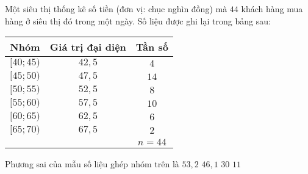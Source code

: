 \begin{ex}%
 Một siêu thị thống kê số tiền (đơn vị: chục nghìn đồng) mà $44$ khách hàng mua hàng ở siêu thị đó trong một ngày. Số liệu được ghi lại trong bảng sau:
 \begin{center}
 \begin{tabular}{|c|c|c|}
 \hline
 Nhóm & Giá trị đại diện & Tần số \\
 \hline
 $[40;45)$ & $42{,}5$ & $4$ \\
 \hline
 $[45;50)$ & $47{,}5$ & $14$ \\
 \hline
 $[50;55)$ & $52{,}5$ & $8$ \\
 \hline
 $[55;60)$ & $57{,}5$ & $10$ \\
 \hline
 $[60;65)$ & $62{,}5$ & $6$ \\
 \hline
 $[65;70)$ & $67{,}5$ & $2$ \\
 \hline
 & & $n=44$ \\
 \hline
 \end{tabular}
 \end{center}
 Phương sai của mẫu số liệu ghép nhóm trên là
 \choice
 {$53{,}2$}
 {\True $46{,}1$}
 {$30$}
 {$11$} 
\end{ex}


